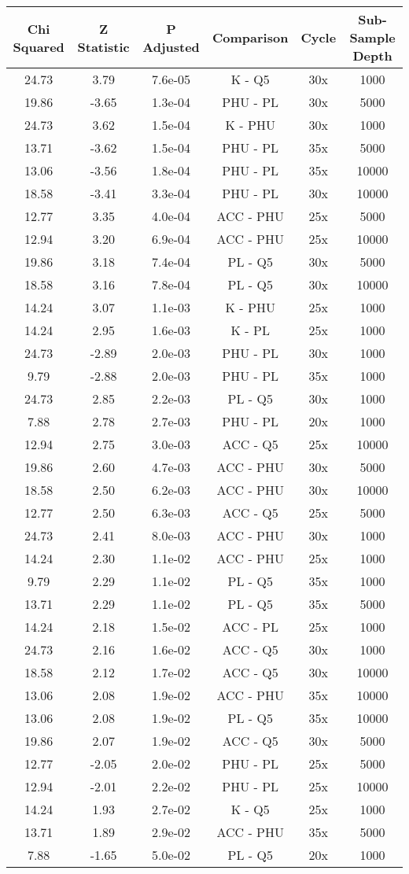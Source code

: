 \documentclass[12pt,]{article}
\begin{document}
\begin{longtable}[]{@{}cccccc@{}}
\toprule
Chi Squared & Z Statistic & P Adjusted & Comparison & Cycle & Sub-Sample
Depth\tabularnewline
\midrule
\endhead
24.73 & 3.79 & 7.6e-05 & K - Q5 & 30x & 1000\tabularnewline
19.86 & -3.65 & 1.3e-04 & PHU - PL & 30x & 5000\tabularnewline
24.73 & 3.62 & 1.5e-04 & K - PHU & 30x & 1000\tabularnewline
13.71 & -3.62 & 1.5e-04 & PHU - PL & 35x & 5000\tabularnewline
13.06 & -3.56 & 1.8e-04 & PHU - PL & 35x & 10000\tabularnewline
18.58 & -3.41 & 3.3e-04 & PHU - PL & 30x & 10000\tabularnewline
12.77 & 3.35 & 4.0e-04 & ACC - PHU & 25x & 5000\tabularnewline
12.94 & 3.20 & 6.9e-04 & ACC - PHU & 25x & 10000\tabularnewline
19.86 & 3.18 & 7.4e-04 & PL - Q5 & 30x & 5000\tabularnewline
18.58 & 3.16 & 7.8e-04 & PL - Q5 & 30x & 10000\tabularnewline
14.24 & 3.07 & 1.1e-03 & K - PHU & 25x & 1000\tabularnewline
14.24 & 2.95 & 1.6e-03 & K - PL & 25x & 1000\tabularnewline
24.73 & -2.89 & 2.0e-03 & PHU - PL & 30x & 1000\tabularnewline
9.79 & -2.88 & 2.0e-03 & PHU - PL & 35x & 1000\tabularnewline
24.73 & 2.85 & 2.2e-03 & PL - Q5 & 30x & 1000\tabularnewline
7.88 & 2.78 & 2.7e-03 & PHU - PL & 20x & 1000\tabularnewline
12.94 & 2.75 & 3.0e-03 & ACC - Q5 & 25x & 10000\tabularnewline
19.86 & 2.60 & 4.7e-03 & ACC - PHU & 30x & 5000\tabularnewline
18.58 & 2.50 & 6.2e-03 & ACC - PHU & 30x & 10000\tabularnewline
12.77 & 2.50 & 6.3e-03 & ACC - Q5 & 25x & 5000\tabularnewline
24.73 & 2.41 & 8.0e-03 & ACC - PHU & 30x & 1000\tabularnewline
14.24 & 2.30 & 1.1e-02 & ACC - PHU & 25x & 1000\tabularnewline
9.79 & 2.29 & 1.1e-02 & PL - Q5 & 35x & 1000\tabularnewline
13.71 & 2.29 & 1.1e-02 & PL - Q5 & 35x & 5000\tabularnewline
14.24 & 2.18 & 1.5e-02 & ACC - PL & 25x & 1000\tabularnewline
24.73 & 2.16 & 1.6e-02 & ACC - Q5 & 30x & 1000\tabularnewline
18.58 & 2.12 & 1.7e-02 & ACC - Q5 & 30x & 10000\tabularnewline
13.06 & 2.08 & 1.9e-02 & ACC - PHU & 35x & 10000\tabularnewline
13.06 & 2.08 & 1.9e-02 & PL - Q5 & 35x & 10000\tabularnewline
19.86 & 2.07 & 1.9e-02 & ACC - Q5 & 30x & 5000\tabularnewline
12.77 & -2.05 & 2.0e-02 & PHU - PL & 25x & 5000\tabularnewline
12.94 & -2.01 & 2.2e-02 & PHU - PL & 25x & 10000\tabularnewline
14.24 & 1.93 & 2.7e-02 & K - Q5 & 25x & 1000\tabularnewline
13.71 & 1.89 & 2.9e-02 & ACC - PHU & 35x & 5000\tabularnewline
7.88 & -1.65 & 5.0e-02 & PL - Q5 & 20x & 1000\tabularnewline
\bottomrule
\end{longtable}
\end{document}
